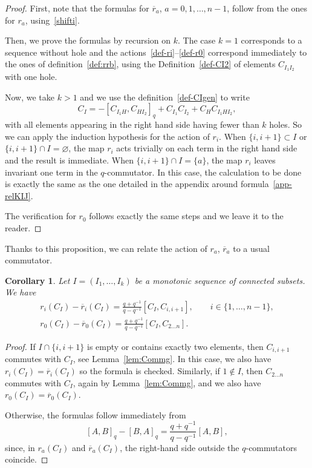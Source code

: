 \documentclass[10pt,a4paper]{amsart}
\numberwithin{equation}{section}
\newtheorem{coro}[theo]{Corollary}
\theoremstyle{definition}
\newcommand{\rb}{\overline{r}}
\begin{document}
\begin{proof}
First, note that the formulas for $\rb_a$, $a=0,1,\dots,n-1$, follow from the ones for $r_a$, using~\eqref{shifti}.

Then, we prove the formulas by recursion on $k$. The case $k=1$ corresponds to a sequence without hole and the actions~\eqref{def-ri}--\eqref{def-r0} correspond immediately to the ones of definition~\ref{def:rrb}, using the Definition~\eqref{def-CI2} of elements $C_{I_1I_2}$ with one hole.

Now, we take $k>1$ and we use the definition~\eqref{def-CIgen} to write
\[C_I=-[C_{I_1H},C_{HI_2}]_q+C_{I_1}C_{I_2}+C_H C_{I_1HI_2} ,\]
with all elements appearing in the right hand side having fewer than $k$ holes. So we can apply the induction hypothesis for the action of $r_i$. When $\{i,i+1\}\subset I$ or $\{i,i+1\}\cap I=\varnothing$, the map $r_i$ acts trivially on each term in the right hand side and the result is immediate. When $\{i,i+1\}\cap I=\{a\}$, the map $r_i$ leaves invariant one term in the $q$-commutator. In this case, the calculation to be done is exactly the same as the one detailed in the appendix around formula~\eqref{app-relKIJ}.

The verification for $r_0$ follows exactly the same steps and we leave it to the reader.
\end{proof}

Thanks to this proposition, we can relate the action of $r_a$, $\rb_a$ to a usual commutator.
\begin{coro}%
Let $I=(I_1,\dots,I_k)$ be a monotonic sequence of connected subsets. We have
\begin{gather*}%
r_i(C_I)-\rb_i(C_I)=\displaystyle\frac{q+q^{-1}}{q-q^{-1}}[C_I,C_{i,i+1}] , \qquad i\in\{1,\dots,n-1\} ,\\
r_0(C_I)-\rb_0(C_I)=\displaystyle\frac{q+q^{-1}}{q-q^{-1}}[C_I,C_{2\dots n}] .
\end{gather*}
\end{coro}
\begin{proof}
If $I\cap\{i,i+1\}$ is empty or contains exactly two elements, then $C_{i,i+1}$ commutes with $C_I$, see Lemma~\ref{lem:Commg}. In this case, we also have $r_i(C_I)=\rb_i(C_I)$ so the formula is checked. Similarly, if $1\notin I$, then $C_{2\dots n}$ commutes with $C_I$, again by Lemma~\ref{lem:Commg}, and we also have $r_0(C_I)=\rb_0(C_I)$.

Otherwise, the formulas follow immediately from
\[ [A , B]_q -[B , A]_q=\frac{q+q^{-1}}{q-q^{-1}}[A , B] ,\]
since, in $r_a(C_I)$ and $\rb_a(C_I)$, the right-hand side outside the $q$-commutators coincide.
\end{proof}
\end{document}
